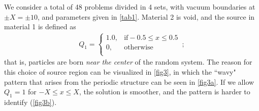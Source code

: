 \documentclass[12pt]{article}
\begin{document}
We consider a total of 48 problems divided in 4 sets, with vacuum boundaries at $\pm X=\pm 10$, and parameters given in \cref{tab1}. Material 2 is void, and the source in material 1 is defined as 
\begin{align}\label{eq18}
Q_1 = \left\{
\begin{array}{cl}
1.0, & \text{if} -0.5\leq x\leq 0.5\\
0, &\text{otherwise}\\
\end{array}
\right .\, ; 
\end{align}
that is, particles are born {\em near the center} of the random system. The reason for this choice of source region can be visualized in \cref{fig3}, in which the ``wavy" pattern that arises from the periodic structure can be seen in \cref{fig3a}. If we allow $Q_1=1$ for $-X\leq x\leq X$, the solution is smoother, and the pattern is harder to identify (\cref{fig3b}).    
\end{document}
